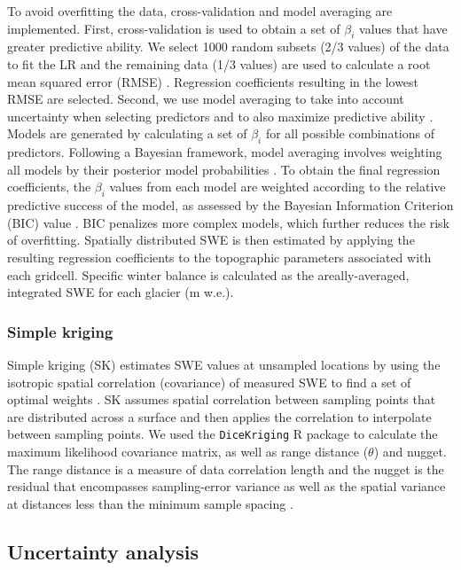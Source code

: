 \documentclass[twocolumn, letterpaper]{igs}
\begin{document}
To avoid overfitting the data, cross-validation and model averaging are implemented. First, cross-validation is used to obtain a set of $\beta_i$ values that have greater predictive ability. We select 1000 random subsets (2/3 values) of the data to fit the LR and the remaining data (1/3 values) are used to calculate a root mean squared error (RMSE) \citep{Kohavi1995}. Regression coefficients resulting in the lowest RMSE are selected. Second, we use model averaging to take into account uncertainty when selecting predictors and to also maximize predictive ability \citep{Madigan1994}. Models are generated by calculating a set of $\beta_i$ for all possible combinations of predictors. Following a Bayesian framework, model averaging involves weighting all models by their posterior model probabilities \citep{Raftery1997}. To obtain the final regression coefficients, the $\beta_i$ values from each model are weighted according to the relative predictive success of the model, as assessed by the Bayesian Information Criterion (BIC) value \citep{Burnham2004}. BIC penalizes more complex models, which further reduces the risk of overfitting. Spatially distributed SWE is then estimated by applying the resulting regression coefficients to the topographic parameters associated with each gridcell. Specific winter balance is calculated as the areally-averaged, integrated SWE for each glacier (m w.e.). 

\subsubsection{Simple kriging}

Simple kriging (SK) estimates SWE values at unsampled locations by using the isotropic spatial correlation (covariance) of measured SWE to find a set of optimal weights \citep{Davis1986, Li2008}. SK assumes spatial correlation between sampling points that are distributed across a surface and then applies the correlation to interpolate between sampling points. We used the \texttt{DiceKriging} R package \citep{Roustant2012} to calculate the maximum likelihood covariance matrix, as well as range distance ($\theta$) and nugget. The range distance is a measure of data correlation length and the nugget is the residual that encompasses sampling-error variance as well as the spatial variance at distances less than the minimum sample spacing \citep{Li2008}. 

\subsection{Uncertainty analysis}
\end{document}
